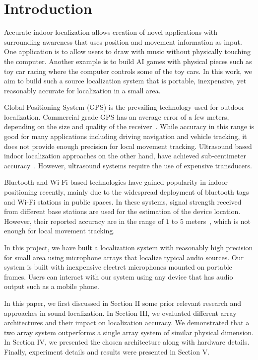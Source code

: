 \section{Introduction}

Accurate indoor localization allows creation of novel applications with surrounding awareness that uses position and movement information as input. One application is to allow users to draw with music without physically touching the computer. Another example is to build AI games with physical pieces such as toy car racing where the computer controls some of the toy cars. In this work, we aim to build such a source localization system that is portable, inexpensive, yet reasonably accurate for localization in a small area. 

Global Positioning System (GPS) is the prevailing technology used for outdoor localization. Commercial grade GPS has an average error of a few meters, depending on the size and quality of the receiver~\cite{intro:gps}. While accuracy in this range is good for many applications including driving navigation and vehicle tracking, it does not provide enough precision for local movement tracking. Ultrasound based indoor localization approaches on the other hand, have achieved sub-centimeter accuracy~\cite{intro:ultra}. However, ultrasound systems require the use of expensive transducers.

Bluetooth and Wi-Fi based technologies have gained popularity in indoor positioning recently, mainly due to the widespread deployment of bluetooth tags and Wi-Fi stations in public spaces. In these systems, signal strength received from different base stations are used for the estimation of the device location. However, their reported accuracy are in the range of $1$ to $5$ meters~\cite{intro:blue, intro:loc}, which is not enough for local movement tracking.

In this project, we have built a localization system with reasonably high precision for small area using microphone arrays that localize typical audio sources. Our system is built with inexpensive electret microphones mounted on portable frames. Users can interact with our system using any device that has audio output such as a mobile phone.

In this paper, we first discussed in Section II some prior relevant research and approaches in sound localization. In Section III, we evaluated different array architectures and their impact on localization accuracy. We demonstrated that a two array system outperforms a single array system of similar physical dimension. In Section IV, we presented the chosen architecture along with hardware details. Finally, experiment details and results were presented in Section V.

